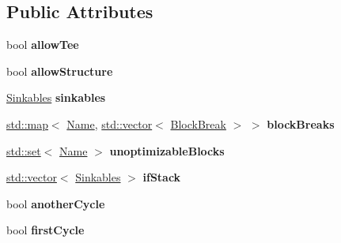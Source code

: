 \subsection*{Public Attributes}
\begin{DoxyCompactItemize}
\item 
\mbox{\label{structwasm_1_1_simplify_locals_ae2dda4a1d64e11e2fff37e581d31a635}} 
bool {\bfseries allow\+Tee}
\item 
\mbox{\label{structwasm_1_1_simplify_locals_a61e916f5096df56b0ccbb0a42953a2b4}} 
bool {\bfseries allow\+Structure}
\item 
\mbox{\label{structwasm_1_1_simplify_locals_a267b827db1beb708ed8bed1514f8a425}} 
\mbox{\hyperlink{classstd_1_1map}{Sinkables}} {\bfseries sinkables}
\item 
\mbox{\label{structwasm_1_1_simplify_locals_a89b0eb25d5d41fae767d9d9715a9d4f9}} 
\mbox{\hyperlink{classstd_1_1map}{std\+::map}}$<$ \mbox{\hyperlink{structwasm_1_1_name}{Name}}, \mbox{\hyperlink{classstd_1_1vector}{std\+::vector}}$<$ \mbox{\hyperlink{structwasm_1_1_simplify_locals_1_1_block_break}{Block\+Break}} $>$ $>$ {\bfseries block\+Breaks}
\item 
\mbox{\label{structwasm_1_1_simplify_locals_acef40bfc85f71d1ec125f905de87b1bd}} 
\mbox{\hyperlink{classstd_1_1set}{std\+::set}}$<$ \mbox{\hyperlink{structwasm_1_1_name}{Name}} $>$ {\bfseries unoptimizable\+Blocks}
\item 
\mbox{\label{structwasm_1_1_simplify_locals_a07cb72929514871b6973a359a7736546}} 
\mbox{\hyperlink{classstd_1_1vector}{std\+::vector}}$<$ \mbox{\hyperlink{classstd_1_1map}{Sinkables}} $>$ {\bfseries if\+Stack}
\item 
\mbox{\label{structwasm_1_1_simplify_locals_acc317a13faf2f2448869baeccb01c064}} 
bool {\bfseries another\+Cycle}
\item 
\mbox{\label{structwasm_1_1_simplify_locals_a35b7624203e6a26c868b5a82f96fdad4}} 
bool {\bfseries first\+Cycle}

\end{DoxyCompactItemize}
